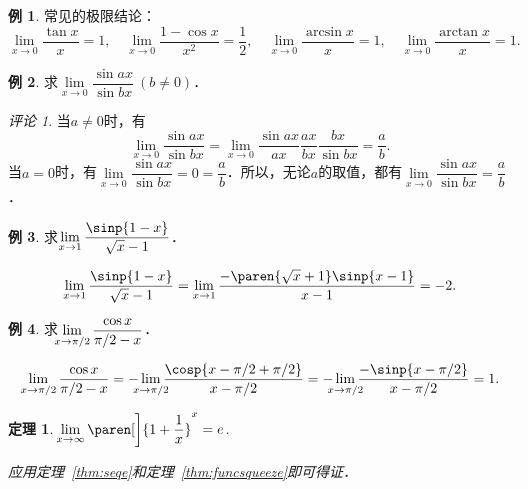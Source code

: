 \documentclass[a4paper,punct=CCT]{ctexbook}
\makeatletter
\newtheorem*{theorem*}{定理}
\theoremstyle{definition}
\newtheorem*{example*}{例}
\theoremstyle{remark}
\newtheorem*{remark}{评论}
\renewenvironment{proof}[1][\proofname]{\par
  \pushQED{\qed}%
  \normalfont \topsep6\p@\@plus6\p@\relax
  \trivlist
  \item[]\ignorespaces
}{%
  \popQED\endtrivlist\@endpefalse
}
\makeatother
\begin{document}
\begin{example*}
  常见的极限结论：
  \begin{equation*}
    \lim_{x\to0} \frac{\tan x}{x} = 1,
    \quad
    \lim_{x\to0} \frac{1 - \cos x}{x^2} = \frac12,
    \quad
    \lim_{x\to0} \frac{\arcsin x}{x} = 1,
    \quad
    \lim_{x\to0} \frac{\arctan x}{x} = 1.
  \end{equation*}
\end{example*}

\begin{example*}
  求\(\lim\limits_{x\to0} \dfrac{\sin ax}{\sin bx}\ (b \ne 0)\)．

  \begin{remark}
    当\(a \ne 0\)时，有
    \begin{equation*}
      \lim_{x\to0} \frac{\sin ax}{\sin bx}
      = \lim_{x\to0} \frac{\sin ax}{ax} \frac{ax}{bx} \frac{bx}{\sin bx}
      = \frac ab.
    \end{equation*}
    当\(a = 0\)时，有\(\lim\limits_{x\to0} \dfrac{\sin ax}{\sin bx} = 0 = \dfrac ab\)．所以，无论\(a\)的取值，都有\(\lim\limits_{x\to0} \dfrac{\sin ax}{\sin bx} = \dfrac ab\)．
  \end{remark}
\end{example*}

\begin{example*}
  求\(\lim\limits_{x\to1} \dfrac{\sinp{1-x}}{\sqrt x - 1}\)．\rule{0ex}{3.5ex}

  \begin{equation*}
    \lim_{x\to1} \frac{\sinp{1-x}}{\sqrt x - 1}
    = \lim_{x\to1} \frac{-\paren{\sqrt x + 1} \sinp{x-1}}{x - 1}
    = -2.
  \end{equation*}
\end{example*}

\begin{example*}
  求\(\;\smashoperator[l]{\lim\limits_{x\to\pi/2}} \dfrac{\cos x}{\pi/2 - x}\)．\rule{0ex}{3.5ex}

  \begin{equation*}
    \lim_{x\to\pi/2} \frac{\cos x}{\pi/2 - x}
    = - \smashoperator{\lim_{x\to\pi/2}} \frac{\cosp{x-\pi/2+\pi/2}}{x - \pi/2}
    = - \smashoperator{\lim_{x\to\pi/2}} \frac{-\sinp{x-\pi/2}}{x-\pi/2}
    = 1.
  \end{equation*}
\end{example*}

\begin{theorem*}
  \(\!\lim\limits_{x\to\infty} \paren[\bigg]{1 + \dfrac1x}^x = e\).\rule{0ex}{3.5ex}

  \begin{proof}
    应用定理~\ref{thm:seqe}和定理~\ref{thm:funcsqueeze}即可得证．
  \end{proof}
\end{theorem*}
\end{document}
